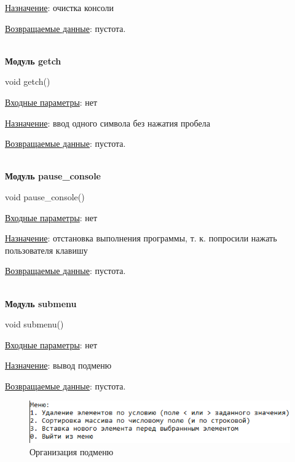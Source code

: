\underline{Назначение}: очистка консоли 

\underline{Возвращаемые данные}: пустота.

\hspace{0pt}\\



\textbf{Модуль getch}

void getch()

\underline{Входные параметры}: нет

\underline{Назначение}: ввод одного символа без нажатия пробела 

\underline{Возвращаемые данные}: пустота.

\hspace{0pt}\\



\textbf{Модуль pause\_console}

void pause\_console()

\underline{Входные параметры}: нет

\underline{Назначение}: отстановка выполнения программы, т. к. попросили нажать пользователя клавишу 

\underline{Возвращаемые данные}: пустота.

\hspace{0pt}\\



\textbf{Модуль submenu}

void submenu()

\underline{Входные параметры}: нет

\underline{Назначение}: вывод подменю 

\underline{Возвращаемые данные}: пустота.

\begin{figure}[!hp]
    \begin{center}
        \includegraphics[width=14cm]{_input/programmDevelopment/submenu.png}
    \end{center}
    \caption{Организация подменю\label{fig:submenu}}
\end{figure}

\hspace{0pt}\\



